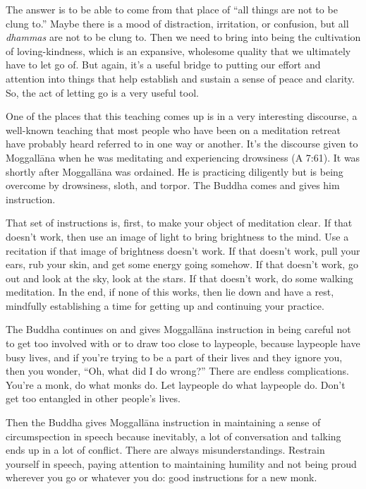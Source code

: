 The answer is to be able to come from that place of “all things are not
to be clung to.” Maybe there is a mood of distraction, irritation, or
confusion, but all \emph{dhammas} are not to be clung to. Then we need
to bring into being the cultivation of loving-kindness, which is an
expansive, wholesome quality that we ultimately have to let go of. But
again, it’s a useful bridge to putting our effort and attention into
things that help establish and sustain a sense of peace and clarity. So,
the act of letting go is a very useful tool.

One of the places that this teaching comes up is in a very interesting
discourse, a well-known teaching that most people who have been on a
meditation retreat have probably heard referred to in one way or
another. It’s the discourse given to Moggallāna when he was meditating
and experiencing drowsiness (A 7:61). It was shortly after Moggallāna
was ordained. He is practicing diligently but is being overcome by
drowsiness, sloth, and torpor. The Buddha comes and gives him
instruction.

That set of instructions is, first, to make your object of meditation
clear. If that doesn’t work, then use an image of light to bring
brightness to the mind. Use a recitation if that image of brightness
doesn’t work. If that doesn’t work, pull your ears, rub your skin, and
get some energy going somehow. If that doesn’t work, go out and look at
the sky, look at the stars. If that doesn’t work, do some walking
meditation. In the end, if none of this works, then lie down and have a
rest, mindfully establishing a time for getting up and continuing your
practice.

The Buddha continues on and gives Moggallāna instruction in being
careful not to get too involved with or to draw too close to laypeople,
because laypeople have busy lives, and if you’re trying to be a part of
their lives and they ignore you, then you wonder, “Oh, what did I do
wrong?” There are endless complications. You’re a monk, do what monks
do. Let laypeople do what laypeople do. Don’t get too entangled in other
people’s lives.

Then the Buddha gives Moggallāna instruction in maintaining a sense of
circumspection in speech because inevitably, a lot of conversation and
talking ends up in a lot of conflict. There are always
misunderstandings. Restrain yourself in speech, paying attention to
maintaining humility and not being proud wherever you go or whatever you
do: good instructions for a new monk.

